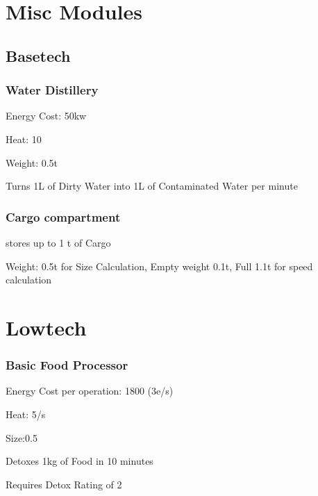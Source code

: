 \section{Misc Modules}\label{sec:miscmodules}
\par
\subsection{Basetech}\label{subsec:basetech}
\subsubsection{Water Distillery}\label{subsubsec:water-distillery}
Energy Cost: 50kw\par
Heat: 10\par
Weight: 0.5t\par
Turns 1L of Dirty Water into 1L of Contaminated Water per minute\par
\par

\subsubsection{Cargo compartment}\label{subsubsec:cargo-compartment}
stores up to 1 t of Cargo\par
Weight: 0.5t for Size Calculation, Empty weight 0.1t, Full 1.1t for speed calculation
\par
\section{Lowtech}\label{sec:lowtech}
\subsubsection{Basic Food Processor}\par
Energy Cost per operation: 1800 (3e/s)\par
Heat: 5/s \par
Size:0.5\par
Detoxes 1kg of Food in 10 minutes \par
Requires Detox Rating of 2\par

